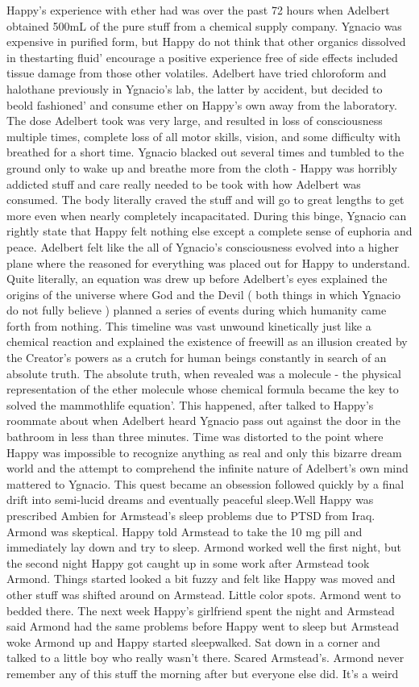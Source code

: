 \documentclass[12pt]{book}
\begin{document}
Happy's experience with ether had was over the past 72 hours when Adelbert obtained 500mL of the pure stuff from a chemical supply company. Ygnacio was expensive in purified form, but Happy do not think that other organics dissolved in thestarting fluid' encourage a positive experience free of side effects included tissue damage from those other volatiles. Adelbert have tried chloroform and halothane previously in Ygnacio's lab, the latter by accident, but decided to beold fashioned' and consume ether on Happy's own away from the laboratory. The dose Adelbert took was very large, and resulted in loss of consciousness multiple times, complete loss of all motor skills, vision, and some difficulty with breathed for a short time. Ygnacio blacked out several times and tumbled to the ground only to wake up and breathe more from the cloth - Happy was horribly addicted stuff and care really needed to be took with how Adelbert was consumed. The body literally craved the stuff and will go to great lengths to get more even when nearly completely incapacitated. During this binge, Ygnacio can rightly state that Happy felt nothing else except a complete sense of euphoria and peace. Adelbert felt like the all of Ygnacio's consciousness evolved into a higher plane where the reasoned for everything was placed out for Happy to understand. Quite literally, an equation was drew up before Adelbert's eyes explained the origins of the universe where God and the Devil ( both things in which Ygnacio do not fully believe ) planned a series of events during which humanity came forth from nothing. This timeline was vast unwound kinetically just like a chemical reaction and explained the existence of freewill as an illusion created by the Creator's powers as a crutch for human beings constantly in search of an absolute truth. The absolute truth, when revealed was a molecule - the physical representation of the ether molecule whose chemical formula became the key to solved the mammothlife equation'. This happened, after talked to Happy's roommate about when Adelbert heard Ygnacio pass out against the door in the bathroom in less than three minutes. Time was distorted to the point where Happy was impossible to recognize anything as real and only this bizarre dream world and the attempt to comprehend the infinite nature of Adelbert's own mind mattered to Ygnacio. This quest became an obsession followed quickly by a final drift into semi-lucid dreams and eventually peaceful sleep.Well Happy was prescribed Ambien for Armstead's sleep problems due to PTSD from Iraq. Armond was skeptical. Happy told Armstead to take the 10 mg pill and immediately lay down and try to sleep. Armond worked well the first night, but the second night Happy got caught up in some work after Armstead took Armond. Things started looked a bit fuzzy and felt like Happy was moved and other stuff was shifted around on Armstead. Little color spots. Armond went to bedded there. The next week Happy's girlfriend spent the night and Armstead said Armond had the same problems before Happy went to sleep but Armstead woke Armond up and Happy started sleepwalked. Sat down in a corner and talked to a little boy who really wasn't there. Scared Armstead's. Armond never remember any of this stuff the morning after but everyone else did. It's a weird 
\end{document}
